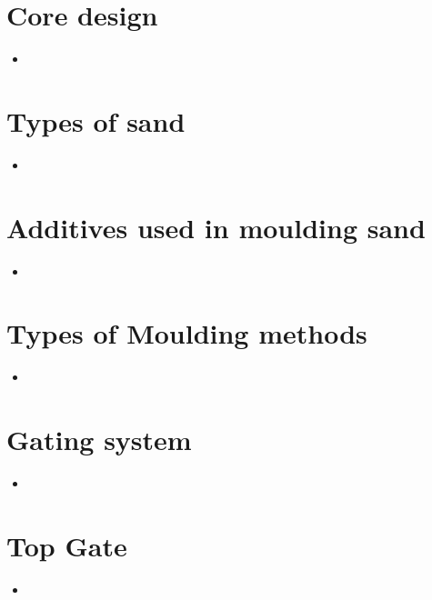 \documentclass[8pt]{report}
\begin{document}
\section{Core design}
	\begin{itemize}
		\item
	\end{itemize}\hrulefill
\section{Types of sand}
	\begin{itemize}
		\item
	\end{itemize}\hrulefill
\section{Additives used in moulding sand}
	\begin{itemize}
		\item
	\end{itemize}\hrulefill
\section{Types of Moulding methods}
	\begin{itemize}
		\item
	\end{itemize}\hrulefill
\section{Gating system}
	\begin{itemize}
		\item
	\end{itemize}\hrulefill
\section{Top Gate}
	\begin{itemize}
		\item
	\end{itemize}\hrulefill
\end{document}
